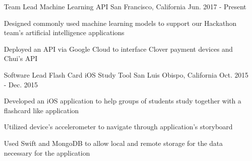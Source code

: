 \begin{cventries}
\cventry
{Team Lead} %
{Machine Learning API} %
{San Francisco, California} %
{Jun. 2017 - Present} %
{ %
\begin{cvitems}
\item {Designed commonly used machine learning models to support our Hackathon team's artificial intelligence applications}
\item {Deployed an API via Google Cloud to interface Clover payment devices and Chui's API}
\end{cvitems}
}

\begin{comment}
\cventry
{Solo} %
{Text File Compression} %
{San Luis Obispo, California} %
{Oct. 2016 - Nov. 2016} %
{ %
\begin{cvitems}
\item {Implemented Huffman Coding to compress text files in Java and C}
\item {Designed complimentary encoding program to compress files into characters to serve an educational purpose for those learning how compression works}
\end{cvitems}
}
\end{comment}

\cventry
{Software Lead} %
{Flash Card iOS Study Tool} %
{San Luis Obispo, California} %
{Oct. 2015 - Dec. 2015} %
{ %
\begin{cvitems}
\item {Developed an iOS application to help groups of students study together with a flashcard like application} \item {Utilized device's accelerometer to navigate through application's storyboard}
\item {Used Swift and MongoDB to allow local and remote storage for the data necessary for the application}
\end{cvitems}
}

\end{cventries}
